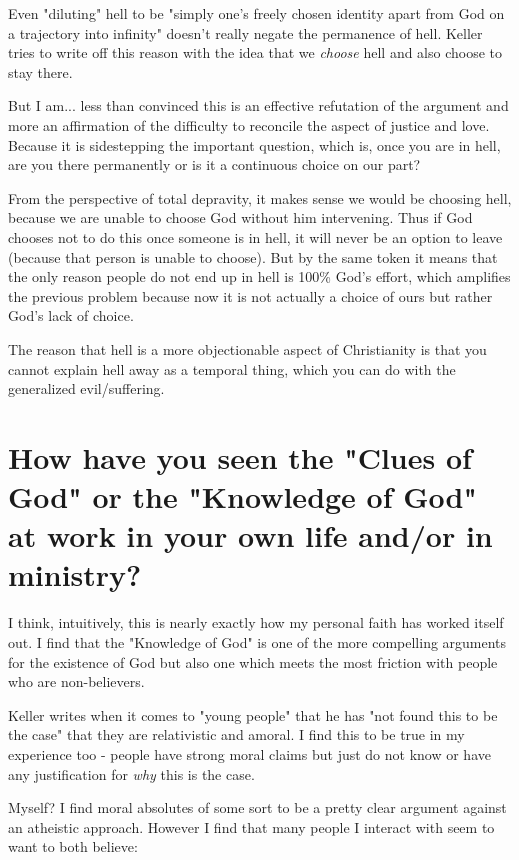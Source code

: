 \documentclass[12pt]{turabian-researchpaper}
\begin{document}
Even "diluting" hell to be "simply one's freely chosen identity apart from God on a trajectory into infinity"\autocite[pg.80]{keller2008reason} doesn't really negate the permanence of hell. Keller tries to write off this reason with the idea that we \textit{choose} hell and also choose to stay there. 

But I am... less than convinced this is an effective refutation of the argument and more an affirmation of the difficulty to reconcile the aspect of justice and love. Because it is sidestepping the important question, which is, once you are in hell, are you there permanently or is it a continuous choice on our part?

From the perspective of total depravity, it makes sense we would be choosing hell, because we are unable to choose God without him intervening. Thus if God chooses not to do this once someone is in hell, it will never be an option to leave (because that person is unable to choose). But by the same token it means that the only reason people do not end up in hell is 100\% God's effort, which amplifies the previous problem because now it is not actually a choice of ours but rather God's lack of choice.

The reason that hell is a more objectionable aspect of Christianity is that you cannot explain hell away as a temporal thing, which you can do with the generalized evil/suffering.

\section{How have you seen the "Clues of God" or the "Knowledge of God" at work in your own life and/or in ministry?}

I think, intuitively, this is nearly exactly how my personal faith has worked itself out. I find that the "Knowledge of God" is one of the more compelling arguments for the existence of God but also one which meets the most friction with people who are non-believers.

Keller writes when it comes to "young people" that he has "not found this to be the case" that they are relativistic and amoral\autocite[pg.149]{keller2008reason}. I find this to be true in my experience too - people have strong moral claims but just do not know or have any justification for \textit{why} this is the case.

Myself? I find moral absolutes of some sort to be a pretty clear argument against an atheistic approach. However I find that many people I interact with seem to want to both believe:
\end{document}
